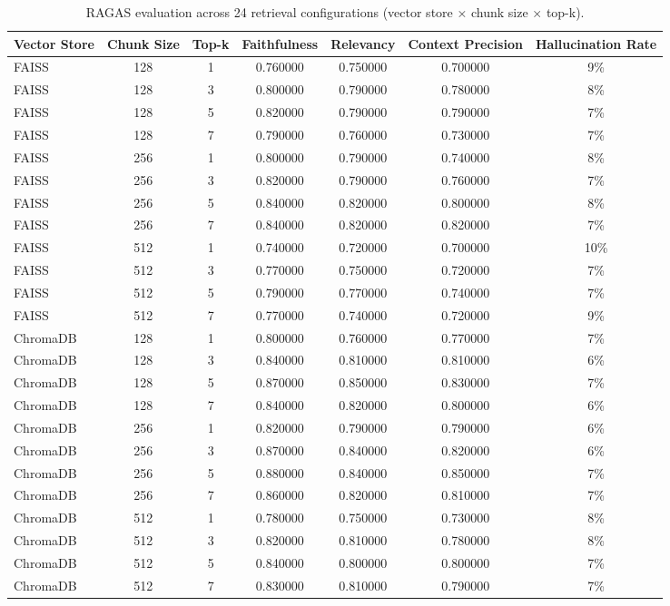 \begin{table}
\caption{RAGAS evaluation across 24 retrieval configurations (vector store × chunk size × top-k).}
\label{tab:tab03_rag_ablation}
\begin{tabular}{lcccccc}
\toprule
Vector Store & Chunk Size & Top-k & Faithfulness & Relevancy & Context Precision & Hallucination Rate \\
\midrule
FAISS & 128 & 1 & 0.760000 & 0.750000 & 0.700000 & 9\% \\
FAISS & 128 & 3 & 0.800000 & 0.790000 & 0.780000 & 8\% \\
FAISS & 128 & 5 & 0.820000 & 0.790000 & 0.790000 & 7\% \\
FAISS & 128 & 7 & 0.790000 & 0.760000 & 0.730000 & 7\% \\
FAISS & 256 & 1 & 0.800000 & 0.790000 & 0.740000 & 8\% \\
FAISS & 256 & 3 & 0.820000 & 0.790000 & 0.760000 & 7\% \\
FAISS & 256 & 5 & 0.840000 & 0.820000 & 0.800000 & 8\% \\
FAISS & 256 & 7 & 0.840000 & 0.820000 & 0.820000 & 7\% \\
FAISS & 512 & 1 & 0.740000 & 0.720000 & 0.700000 & 10\% \\
FAISS & 512 & 3 & 0.770000 & 0.750000 & 0.720000 & 7\% \\
FAISS & 512 & 5 & 0.790000 & 0.770000 & 0.740000 & 7\% \\
FAISS & 512 & 7 & 0.770000 & 0.740000 & 0.720000 & 9\% \\
ChromaDB & 128 & 1 & 0.800000 & 0.760000 & 0.770000 & 7\% \\
ChromaDB & 128 & 3 & 0.840000 & 0.810000 & 0.810000 & 6\% \\
ChromaDB & 128 & 5 & 0.870000 & 0.850000 & 0.830000 & 7\% \\
ChromaDB & 128 & 7 & 0.840000 & 0.820000 & 0.800000 & 6\% \\
ChromaDB & 256 & 1 & 0.820000 & 0.790000 & 0.790000 & 6\% \\
ChromaDB & 256 & 3 & 0.870000 & 0.840000 & 0.820000 & 6\% \\
ChromaDB & 256 & 5 & 0.880000 & 0.840000 & 0.850000 & 7\% \\
ChromaDB & 256 & 7 & 0.860000 & 0.820000 & 0.810000 & 7\% \\
ChromaDB & 512 & 1 & 0.780000 & 0.750000 & 0.730000 & 8\% \\
ChromaDB & 512 & 3 & 0.820000 & 0.810000 & 0.780000 & 8\% \\
ChromaDB & 512 & 5 & 0.840000 & 0.800000 & 0.800000 & 7\% \\
ChromaDB & 512 & 7 & 0.830000 & 0.810000 & 0.790000 & 7\% \\
\bottomrule
\end{tabular}
\end{table}
